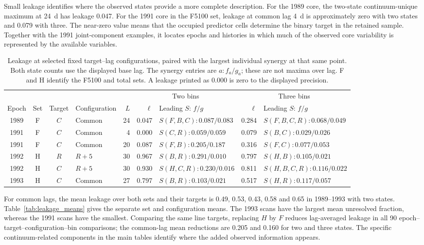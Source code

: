 \documentclass[fleqn,usenatbib]{mnras}
\newenvironment{SURDtable}{\begin{table}}{\end{table}}
\begin{document}
Small leakage identifies where the observed states provide a more complete description. For the 1989 core, the two-state continuum-unique maximum at 24~d has leakage 0.047. For the 1991 core in the F5100 set, leakage at common lag 4~d is approximately zero with two states and 0.079 with three. The near-zero value means that the occupied predictor cells determine the binary target in the retained sample. Together with the 1991 joint-component examples, it locates epochs and histories in which much of the observed core variability is represented by the available variables.

\begin{SURDtable}
\centering
\caption{Leakage at selected fixed target--lag configurations, paired with the largest individual synergy at that same point. Both state counts use the displayed base lag. The synergy entries are $a:f_a/g_a$; these are not maxima over lag. F and H identify the F5100 and total sets. A leakage printed as 0.000 is zero to the displayed precision.}
\label{tab:leakage_cases}
\small
\begin{tabular}{ccclrrlrl}
\toprule
& & & & & \multicolumn{2}{c}{Two bins} & \multicolumn{2}{c}{Three bins} \\ \cmidrule(lr){6-7}\cmidrule(lr){8-9} Epoch & Set & Target & Configuration & $L$ & $\ell$ & Leading $S$: $f/g$ & $\ell$ & Leading $S$: $f/g$ \\
\midrule
1989 & F & $C$ & Common & 24 & 0.047 & $S(F,B,C):0.087/0.083$ & 0.284 & $S(F,B,C,R):0.068/0.049$ \\
1991 & F & $C$ & Common & 4 & 0.000 & $S(C,R):0.059/0.059$ & 0.079 & $S(B,C):0.029/0.026$ \\
1991 & F & $C$ & Common & 20 & 0.087 & $S(F,B):0.205/0.187$ & 0.316 & $S(F,C):0.077/0.053$ \\
1992 & H & $R$ & $R+5$ & 30 & 0.967 & $S(B,R):0.291/0.010$ & 0.797 & $S(H,B):0.105/0.021$ \\
1992 & H & $C$ & $R+5$ & 30 & 0.930 & $S(H,C,R):0.230/0.016$ & 0.811 & $S(H,B,C,R):0.116/0.022$ \\
1993 & H & $C$ & Common & 27 & 0.797 & $S(B,R):0.103/0.021$ & 0.517 & $S(H,R):0.117/0.057$ \\
\bottomrule
\end{tabular}
\end{SURDtable}


For common lags, the mean leakage over both sets and their targets is 0.49, 0.53, 0.43, 0.58 and 0.65 in 1989--1993 with two states. Table~\ref{tab:leakage_means} gives the separate set and configuration means. The 1993 scans have the largest mean unresolved fraction, whereas the 1991 scans have the smallest. Comparing the same line targets, replacing $H$ by $F$ reduces lag-averaged leakage in all 90 epoch--target--configuration--bin comparisons; the common-lag mean reductions are 0.205 and 0.160 for two and three states. The specific continuum-related components in the main tables identify where the added observed information appears.
\end{document}
